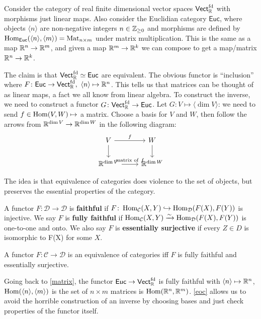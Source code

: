 \begin{example}\label{matrix} 
    Consider the category of real finite dimensional vector spaces $\mathsf{Vect} _{\mathbb{R}}^{\mathrm{fd}}$ with morphisms just linear maps. Also consider the Euclidian category $\mathsf{Euc} $, where objects $\langle n \rangle $ are non-negative integers $n \in \mathbb{Z} _{\geq 0}$ and morphisms are defined by $\operatorname{Hom} _{\mathsf{Euc} }(\langle n \rangle ,\langle m \rangle )=\mathrm{Mat}_{n \times m}$ under matrix multiplication. This is the same as a map $\mathbb{R}^n  \to \mathbb{R}^m$, and given a map $\mathbb{R}^m \to \mathbb{R}^k$ we can compose to get a map/matrix $\mathbb{R}^n  \to \mathbb{R}^k$.

    The claim is that $\mathsf{Vect} _{\mathbb{R}}^{\mathrm{fd}}\simeq \mathsf{Euc} $ are equivalent. The obvious functor is ``inclusion'' where $F \colon \mathsf{Euc}  \to \mathsf{Vect} _{\mathbb{R}}^{\mathrm{fd}},\ \langle n \rangle \mapsto \mathbb{R}^n $. This tells us that matrices can be thought of as linear maps, a fact we all know from linear algebra. To construct the inverse, we need to construct a functor $G \colon \mathsf{Vect} _{\mathbb{R}}^{\mathrm{fd}} \to \mathsf{Euc} $. Let $G \colon V \mapsto \langle \dim V \rangle  $: we need to send $f \in \operatorname{Hom}(V,W) \mapsto $ a matrix. Choose a basis for $V$ and $W$, then follow the arrows from $\mathbb{R}^{\dim V}\to \mathbb{R}^{\dim W}$ in the following diagram: 
    \[
    \begin{tikzcd}
        V\arrow[r,"f"]\arrow[d] & W\arrow[d]\\
        \R^{\dim V}\arrow[r,"\text{matrix of} \ f"]& \R^{\dim W}
    \end{tikzcd}
    \] 
\end{example}
The idea is that equivalence of categories does violence to the set of objects, but preserves the essential properties of the category.

\begin{definition}[]
    A functor $F \colon \mathcal{D}  \to \mathcal{D} $ is \textbf{faithful} if $F \colon \operatorname{Hom} _{\mathcal{C} }(X,Y) \hookrightarrow \operatorname{Hom} _{\mathcal{D} }(F(X),F(Y)) $ is injective. We say $F$ is \textbf{fully faithful} if $\operatorname{Hom} _{\mathcal{C} }(X,Y) \xrightarrow{\sim}\operatorname{Hom} _{\mathcal{D} }(F(X),F(Y)) $ is one-to-one and onto. We also say  $F$ is \textbf{essentially surjective} if every $Z \in D$ is isomorphic to F(X) for some $X$.
\end{definition}


\begin{theorem}\label{eoc} 
    A functor $F \colon \mathcal{C}  \to \mathcal{D} $ is an equivalence of categories iff $F$ is fully faithful and essentially surjective.
\end{theorem}
Going back to \cref{matrix}, the functor $\mathsf{Euc} \to \mathsf{Vect} _{\mathbb{R}}^{\mathrm{fd}}$ is fully faithful with $\langle n \rangle \mapsto  \mathbb{R}^n $, $\operatorname{Hom}(\langle n \rangle ,\langle m \rangle )$ is the set of $n \times m$ matrices is $\operatorname{Hom}(\mathbb{R}^n ,\mathbb{R}^m)$. \cref{eoc} allows us to avoid the horrible construction of an inverse by choosing bases and just check properties of the functor itself.

